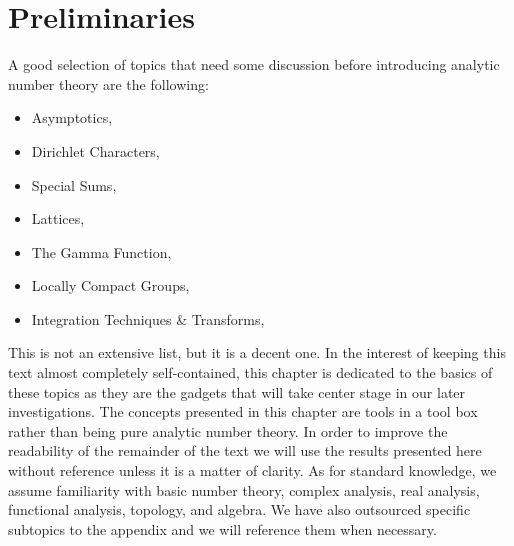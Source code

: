 \chapter{Preliminaries}\label{ch:Preliminaries}
  A good selection of topics that need some discussion before introducing analytic number theory are the following:
  \begin{itemize}
    \item Asymptotics,
    \item Dirichlet Characters,
    \item Special Sums,
    \item Lattices,
    \item The Gamma Function,
    \item Locally Compact Groups,
    \item Integration Techniques \& Transforms,
  \end{itemize}
  This is not an extensive list, but it is a decent one. In the interest of keeping this text almost completely self-contained, this chapter is dedicated to the basics of these topics as they are the gadgets that will take center stage in our later investigations. The concepts presented in this chapter are tools in a tool box rather than being pure analytic number theory. In order to improve the readability of the remainder of the text we will use the results presented here without reference unless it is a matter of clarity. As for standard knowledge, we assume familiarity with basic number theory, complex analysis, real analysis, functional analysis, topology, and algebra. We have also outsourced specific subtopics to the appendix and we will reference them when necessary.
